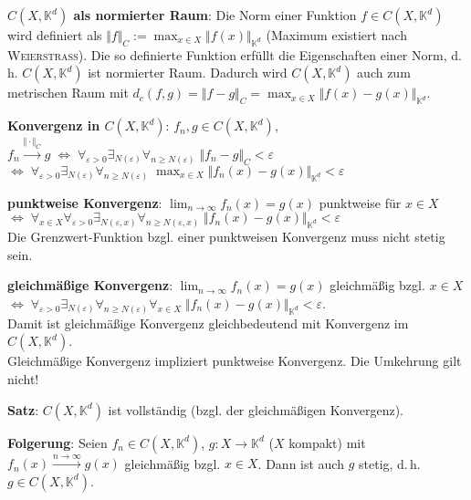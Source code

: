 \textbf{$C(X, \mathbb{K}^d)$ als normierter Raum}:
Die Norm einer Funktion $f \in C(X, \mathbb{K}^d)$ wird definiert als
$\Vert f \Vert_C := \max_{x \in X} \Vert f(x) \Vert_{\mathbb{K}^d}$
(Maximum existiert nach \textsc{Weierstrass}).
Die so definierte Funktion erfüllt die Eigenschaften einer Norm,
d.\,h. $C(X, \mathbb{K}^d)$ ist normierter Raum.
Dadurch wird $C(X, \mathbb{K}^d)$ auch zum metrischen Raum mit
$d_c(f,g) = \Vert f - g \Vert_C =
\max_{x \in X} \Vert f(x) - g(x) \Vert_{\mathbb{K}^d}$.

\linie

\textbf{Konvergenz in $C(X, \mathbb{K}^d)$}:
$f_n, g \in C(X, \mathbb{K}^d)$, \quad
$f_n \xrightarrow{\Vert \cdot \Vert_C} g \;\Leftrightarrow\;
\forall_{\varepsilon > 0} \exists_{N(\varepsilon)}
\forall_{n \ge N(\varepsilon)}\; \Vert f_n - g \Vert_C < \varepsilon$ \\
$\Leftrightarrow\; \forall_{\varepsilon > 0} \exists_{N(\varepsilon)}
\forall_{n \ge N(\varepsilon)}\;
\max_{x \in X} \Vert f_n(x) - g(x) \Vert_{\mathbb{K}^d} < \varepsilon$

\textbf{punktweise Konvergenz}:
$\lim_{n \to \infty} f_n(x) = g(x)$ punktweise für $x \in X$ \\
$\Leftrightarrow\; \forall_{x \in X} \forall_{\varepsilon > 0}
\exists_{N(\varepsilon, x)} \forall_{n \ge N(\varepsilon, x)}\;
\Vert f_n(x) - g(x) \Vert_{\mathbb{K}^d} < \varepsilon$ \\
Die Grenzwert-Funktion bzgl. einer punktweisen Konvergenz muss nicht stetig
sein.

\textbf{gleichmäßige Konvergenz}:
$\lim_{n \to \infty} f_n(x) = g(x)$ gleichmäßig bzgl. $x \in X$ \\
$\Leftrightarrow\; \forall_{\varepsilon > 0} \exists_{N(\varepsilon)}
\forall_{n \ge N(\varepsilon)} \forall_{x \in X}\;
\Vert f_n(x) - g(x) \Vert_{\mathbb{K}^d} < \varepsilon$. \\
Damit ist gleichmäßige Konvergenz gleichbedeutend mit Konvergenz im
$C(X, \mathbb{K}^d)$. \\
Gleichmäßige Konvergenz impliziert punktweise Konvergenz.
Die Umkehrung gilt nicht!

\textbf{Satz}: $C(X, \mathbb{K}^d)$ ist vollständig
(bzgl. der gleichmäßigen Konvergenz).

\textbf{Folgerung}: Seien $f_n \in C(X, \mathbb{K}^d)$,
$g: X \rightarrow \mathbb{K}^d$ ($X$ kompakt) mit
$f_n(x) \xrightarrow{n \to \infty} g(x)$ gleichmäßig bzgl. $x \in X$.
Dann ist auch $g$ stetig, d.\,h. $g \in C(X, \mathbb{K}^d)$.

\pagebreak
